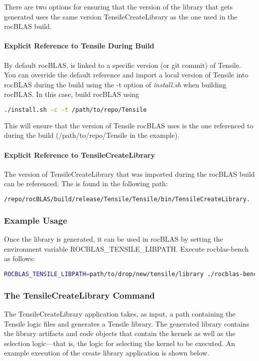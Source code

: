 \documentclass[]{article}
\begin{document}
There are two options for ensuring that the version of the library that gets generated uses the same version TensileCreateLibrary as the one used in the rocBLAS build.

\paragraph{Explicit Reference to Tensile During Build}
By default rocBLAS, is linked to a specific version (or git commit) of Tensile. You can override the default reference and import a local version of Tensile into rocBLAS during the build using the -t option of \emph{install.sh} when building rocBLAS. In this case, build rocBLAS using

\begin{lstlisting}[language=bash]
./install.sh -c -t /path/to/repo/Tensile
\end{lstlisting}

\noindent
This will ensure that the version of Tensile rocBLAS uses is the one referenced to during the build (/path/to/repo/Tensile in the example).

\paragraph{Explicit Reference to TensileCreateLibrary}

The version of TensileCreateLibrary that was imported during the rocBLAS build can be referenced. The is found in the following path:

\begin{lstlisting}[language=bash]
/repo/rocBLAS/build/release/Tensile/Tensile/bin/TensileCreateLibrary.
\end{lstlisting}

\subsubsection{Example Usage}

Once the library is generated, it can be used in rocBLAS by setting the environment variable ROCBLAS\_TENSILE\_LIBPATH. Execute rocblas-bench as follows:

\begin{lstlisting}[language=bash]
ROCBLAS_TENSILE_LIBPATH=path/to/drop/new/tensile/library ./rocblas-bench --yaml problem_sizes.yaml
\end{lstlisting}

\subsubsection{The TensileCreateLibrary Command}
The TensileCreateLibrary application takes, as input, a path containing the Tensile logic files and generates a Tensile library. The generated library contains the library artifacts and code objects that contain the kernels as well as the selection logic---that is, the logic for selecting the kernel to be executed. An example execution of the create library application is shown below.
\end{document}

